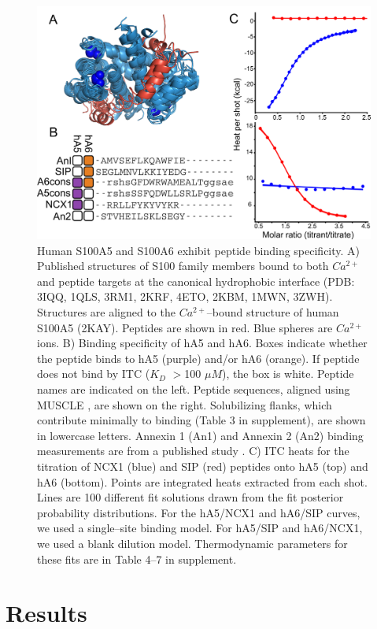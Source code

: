 \begin{figure}
\centering
	\includegraphics{ch5-fig1.png} 
\caption[Human S100A5 and S100A6 exhibit peptide binding specificity]{Human S100A5 and S100A6 exhibit peptide binding specificity. A) Published structures of S100 family members bound to both $Ca^{2+}$
and peptide targets at the canonical hydrophobic interface (PDB: 3IQQ, 1QLS, 3RM1, 2KRF, 4ETO, 2KBM, 1MWN, 3ZWH). Structures are aligned
to the $Ca^{2+}$--bound structure of human S100A5 (2KAY). Peptides
are shown in red. Blue spheres are $Ca^{2+}$ ions. B) Binding specificity
of hA5 and hA6. Boxes indicate whether the peptide binds to hA5 (purple)
and/or hA6 (orange). If peptide does not bind by ITC ($K_{D}$ $>$100 $\mu M$),
the box is white. Peptide names are indicated on the left. Peptide
sequences, aligned using MUSCLE \citep{edgar_muscle:_2004}, are shown
on the right. Solubilizing flanks, which contribute minimally to binding
(Table 3 in supplement), are shown in lowercase letters. Annexin 1 (An1) and Annexin
2 (An2) binding measurements are from a published study \citep{streicher_annexin_2009}.
C) ITC heats for the titration of NCX1 (blue) and SIP (red) peptides
onto hA5 (top) and hA6 (bottom). Points are integrated heats extracted
from each shot. Lines are 100 different fit solutions drawn from the
fit posterior probability distributions. For the hA5/NCX1
and hA6/SIP curves, we used a single--site binding model. For hA5/SIP
and hA6/NCX1, we used a blank dilution model. Thermodynamic parameters
for these fits are in Table 4--7 in supplement.\label{samplefigure}}	
\end{figure}

\section{Results}

